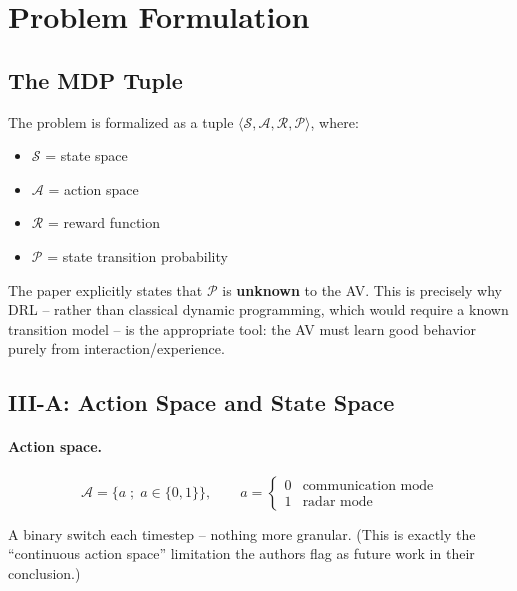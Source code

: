 \documentclass[11pt]{article}
\begin{document}
\section{Problem Formulation}

\subsection{The MDP Tuple}
The problem is formalized as a tuple $\langle \mathcal{S}, \mathcal{A}, \mathcal{R},
\mathcal{P} \rangle$, where:
\begin{itemize}[leftmargin=1.5em]
    \item $\mathcal{S}$ = state space
    \item $\mathcal{A}$ = action space
    \item $\mathcal{R}$ = reward function
    \item $\mathcal{P}$ = state transition probability
\end{itemize}

\begin{remark}
The paper explicitly states that $\mathcal{P}$ is \textbf{unknown} to the AV. This is
precisely why DRL -- rather than classical dynamic programming, which would require a
known transition model -- is the appropriate tool: the AV must learn good behavior
purely from interaction/experience.
\end{remark}

\subsection{III-A: Action Space and State Space}

\paragraph{Action space.}
\begin{equation}
    \mathcal{A} = \{a \; ; \; a \in \{0,1\}\}, \qquad
    a = \begin{cases} 0 & \text{communication mode} \\ 1 & \text{radar mode} \end{cases}
\end{equation}

A binary switch each timestep -- nothing more granular. (This is exactly the
``continuous action space'' limitation the authors flag as future work in their
conclusion.)
\end{document}
